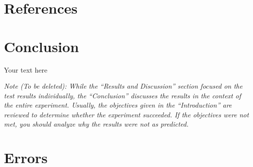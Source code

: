 \documentclass[10pt]{article}
\begin{document}
\medskip


\section{References}

\medskip

\section{Conclusion}

Your text here

\medskip

\textit{Note (To be deleted): While the ``Results and Discussion'' section focused on the test results individually, the ``Conclusion'' discusses the results in the context of the entire experiment. Usually, the objectives given in the ``Introduction'' are reviewed to determine whether the experiment succeeded. If the objectives were not met, you should analyze why the results were not as predicted.}

\section{Errors}
 
\end{document}
